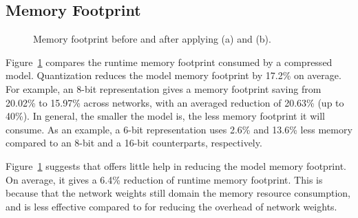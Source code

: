 \subsection{Memory Footprint}

\begin{figure}[!t]
\centering
{}
\hfill
{}
\hfill

\caption{Memory footprint before and after applying \quantization(a) and \pruning (b).} \label{fig:footprint}
\vspace{-6mm}
\end{figure}

Figure~\ref{fig:footprint} compares the runtime memory footprint consumed by a compressed model. Quantization reduces the model memory
footprint by 17.2\% on average. For example, an 8-bit representation gives a memory footprint saving from 20.02\% to 15.97\% across
networks, with an averaged reduction of 20.63\% (up to 40\%). In general, the smaller the model is, the less memory footprint it will
consume. As an example, a 6-bit representation uses 2.6\% and 13.6\% less memory compared to an 8-bit and a 16-bit counterparts,
respectively.

Figure~\ref{fig:footprint} suggests that  \pruning offers little help in reducing the model memory footprint. On average, it gives a 6.4\%
reduction of runtime memory footprint. This is because that the network weights still domain the memory resource consumption, and \pruning
is less effective compared to \dquantization for reducing the overhead of network weights.



